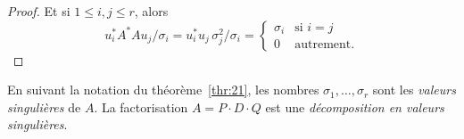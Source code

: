 \begin{proof}
Et  si $1 ≤i,j \leq r$, alors 
\begin{displaymath}
  u_i^* A^* A u_j / \sigma_i = u_i^* u_j \,  \sigma_j^2 / \sigma_i=
  \begin{cases}
    \sigma_i & \text{si } i=j\\
    0 & \text{autrement}.  
  \end{cases}
\end{displaymath}
\end{proof}


\begin{definition}
  \label{def:24}
  En suivant la notation du théorème~\ref{thr:21}, 
  les nombres $\sigma_1,\dots,\sigma_r$ sont les \emph{valeurs singulières} de $A$. La factorisation $A = P\cdot D \cdot Q$ est une \emph{décomposition en valeurs singulières}. 
\end{definition}




